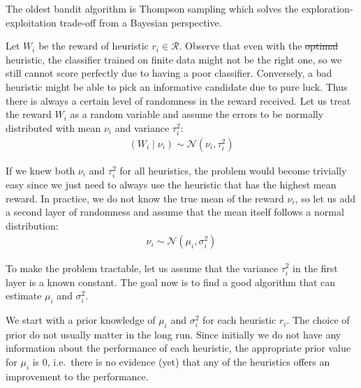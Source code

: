 \documentclass[fleqn,10pt,lineno]{wlpeerj} %
\newcommand{\Normal}{\mathcal{N}}
\newcommand{\R}{\mathcal{R}}
\providecommand{\DIFaddtex}[1]{{\protect\color{blue}\uwave{#1}}} %
\providecommand{\DIFdeltex}[1]{{\protect\color{red}\sout{#1}}}                      %
\providecommand{\DIFaddbegin}{} %
\providecommand{\DIFaddend}{} %
\providecommand{\DIFdelbegin}{} %
\providecommand{\DIFdelend}{} %
\providecommand{\DIFadd}[1]{\texorpdfstring{\DIFaddtex{#1}}{#1}} %
\providecommand{\DIFdel}[1]{\texorpdfstring{\DIFdeltex{#1}}{}} %
\begin{document}
The oldest bandit algorithm is Thompson sampling \citep{thompson33} which
solves the exploration-exploitation trade-off from a Bayesian perspective.

Let $W_i$ be the reward of heuristic $r_i \in \R$. Observe
that even with the \DIFdelbegin \DIFdel{optimal }\DIFdelend \DIFaddbegin \DIFadd{best }\DIFaddend heuristic, the
classifier trained on finite data might not be the right one, so we still
cannot score perfectly due to having a poor classifier. Conversely, a bad
heuristic might be able to pick an informative candidate due to pure luck. Thus
there is always a certain level of randomness in the reward received. Let us
treat the reward  $W_i$ as a random variable and assume the errors to be
normally distributed with mean $\nu_i$ and variance $\tau_i^2$:
	\begin{align}
		(W_i \mid \nu_i) \sim \Normal(\nu_i, \tau_i^2)
	\end{align}

If we knew both $\nu_i$ and $\tau_i^2$ for all heuristics, the problem would
become trivially easy since we just need to always use the heuristic that has
the highest mean reward. In practice, we do not know the true mean of the
reward $\nu_i$, so let us add a second layer of randomness and assume that
the mean itself follows a normal distribution:
	\begin{align}
        \nu_i \sim \Normal(\mu_i, \sigma_i^2)
    \end{align}

To make the problem tractable, let us assume that the variance $\tau_i^2$ in
the first layer is a known constant. The goal now is to find a good algorithm
that can estimate $\mu_i$ and $\sigma_i^2$.

We start with a prior knowledge of $\mu_i$ and $\sigma_i^2$ for each heuristic
$r_i$. The choice of prior do not usually matter in the long run. Since
initially we do not have any information about the performance of each
heuristic, the appropriate prior value for $\mu_i$ is $0$, i.e.\ there is no
evidence (yet) that any of the heuristics offers an improvement to the
performance.
\end{document}
